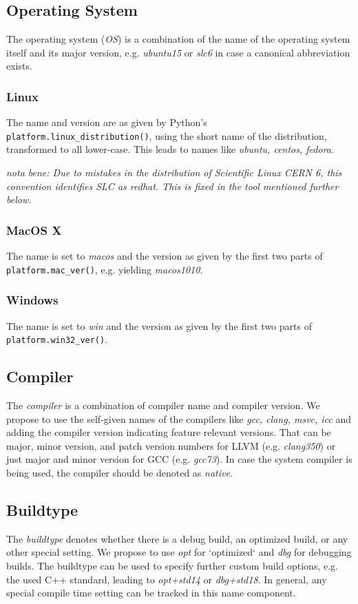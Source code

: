 \documentclass[12pt,a4paper]{article}
\begin{document}
\subsection{Operating System}
The operating system (\emph{OS}) is a combination of the name of the operating system itself and its major version, e.g. \emph{ubuntu15} or \emph{slc6} in case a canonical abbreviation exists. 


\subsubsection{Linux}
The name and version are as given by Python's \texttt{platform.linux\_distribution()}, using the short name of the distribution, transformed to all lower-case. This leads to names like \emph{ubuntu, centos, fedora}.

\emph{nota bene: Due to mistakes in the distribution of Scientific Linux CERN 6, this convention identifies SLC as redhat. This is fixed in the tool mentioned further below.}

\subsubsection{MacOS X}
The name is set to \emph{macos} and the version as given by the first two parts of \texttt{platform.mac\_ver()}, e.g. yielding \emph{macos1010}.

\subsubsection{Windows}
The name is set to \emph{win} and the version as given by the first two parts of \texttt{platform.win32\_ver()}.


\subsection{Compiler}
The \emph{compiler} is a combination of compiler name and compiler version. We propose to use the self-given names of the compilers like \emph{gcc, clang, msvc, icc} and adding the compiler version indicating feature relevant versions. That can be major, minor version, and patch version numbers for LLVM (e.g. \emph{clang350}) or just major and minor version for GCC (e.g. \emph{gcc73}). In case the system compiler is being used, the compiler should be denoted as \emph{native}. 


\subsection{Buildtype}
The \emph{buildtype} denotes whether there is a debug build, an optimized build, or any other special setting. We propose to use \emph{opt} for `optimized` and \emph{dbg} for debugging builds. The buildtype can be used to specify further custom build options, e.g. the used C++ standard, leading to \emph{opt+std14} or \emph{dbg+std18}.
In general, any special compile time setting can be tracked in this name component.  
\end{document}
